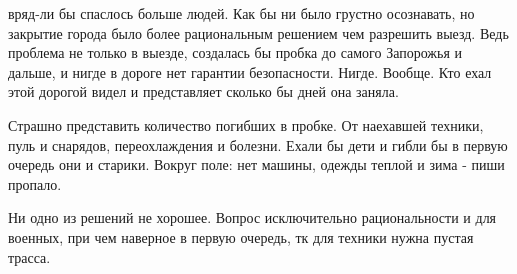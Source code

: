 вряд-ли бы спаслось больше людей. Как бы ни было грустно осознавать, но
закрытие города было более рациональным решением чем разрешить выезд. Ведь
проблема не только в выезде, создалась бы пробка до самого Запорожья и дальше,
и нигде в дороге нет гарантии безопасности. Нигде. Вообще. Кто ехал этой
дорогой видел и представляет сколько бы дней она заняла.

Страшно представить количество погибших в пробке. От наехавшей техники, пуль и
снарядов, переохлаждения и болезни. Ехали бы дети и гибли бы в первую очередь
они и старики. Вокруг поле: нет машины, одежды теплой и зима - пиши пропало.

Ни одно из решений не хорошее. Вопрос исключительно рациональности и для
военных, при чем наверное в первую очередь, тк для техники нужна пустая трасса.

